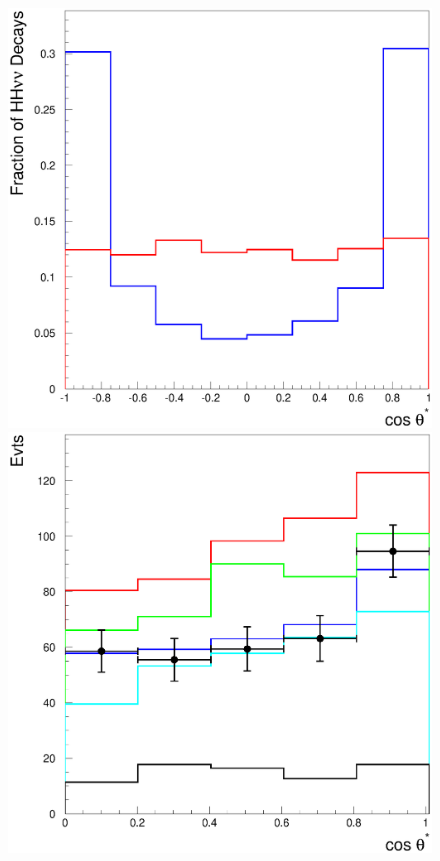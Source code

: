 \begin{figure}[!h]
\vspace*{-0.8cm}
\begin{center}
\includegraphics[scale=0.35]{./sm4/ee-clic-hh1.eps} 
\includegraphics[scale=0.35]{./sm4/ee-clic-hh2.eps}

\end{center}
\end{figure}

